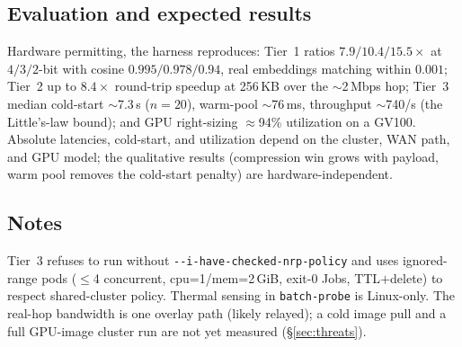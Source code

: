 \documentclass[conference]{IEEEtran}
\begin{document}
\subsection{Evaluation and expected results}
Hardware permitting, the harness reproduces: Tier~1 ratios $7.9/10.4/15.5\times$ at $4/3/2$-bit with
cosine $0.995/0.978/0.94$, real embeddings matching within $0.001$; Tier~2 up to $8.4\times$
round-trip speedup at 256\,KB over the $\sim$2\,Mbps hop; Tier~3 median cold-start $\sim$7.3\,s ($n{=}20$),
warm-pool $\sim$76\,ms, throughput $\sim$740/s (the Little's-law bound); and GPU
right-sizing $\approx$94\% utilization on a GV100. Absolute latencies, cold-start, and utilization
depend on the cluster, WAN path, and GPU model; the qualitative results (compression win grows with
payload, warm pool removes the cold-start penalty) are hardware-independent.

\subsection{Notes}
Tier~3 refuses to run without \texttt{-{}-i-have-checked-nrp-policy} and uses ignored-range pods
($\le$4 concurrent, cpu=1/mem=2\,GiB, exit-0 Jobs, TTL${+}$delete) to respect shared-cluster policy.
Thermal sensing in \texttt{batch-probe} is Linux-only. The real-hop bandwidth is one overlay path
(likely relayed); a cold image pull and a full GPU-image cluster run are not yet measured
(\S\ref{sec:threats}).



\end{document}
